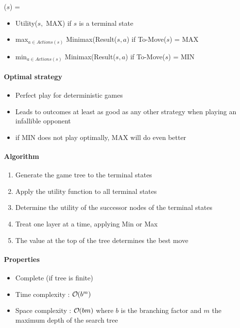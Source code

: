($s$) =
\begin{itemize}
\item Utility($s,$ MAX) if $s$ is a terminal state
\item max$_{a \in \textit{Actions}(s)}$ Minimax(Result($s, a$) if To-Move($s$) = MAX
\item min$_{a \in \textit{Actions}(s)}$ Minimax(Result($s, a$) if To-Move($s$) = MIN
\end{itemize} 

\paragraph{Optimal strategy}
\begin{itemize}
\item Perfect play for deterministic games
\item Leads to outcomes at least as good as any other strategy when playing an infallible opponent
\item if MIN does not play optimally, MAX will do even better
\end{itemize}

\paragraph{Algorithm}

\begin{enumerate}
\item Generate the game tree to the terminal states
\item Apply the utility function to all terminal states
\item Determine the utility of the successor nodes of the terminal states
\item Treat one layer at a time, applying Min or Max
\item The value at the top of the tree determines the best move
\end{enumerate}

\paragraph{Properties}

\begin{itemize}
\item Complete (if tree is finite)
\item Time complexity : $\bigO (b^m)$
\item Space complexity : $\bigO (bm)$ where $b$ is the branching factor and $m$ the maximum depth of the search tree
\end{itemize}

